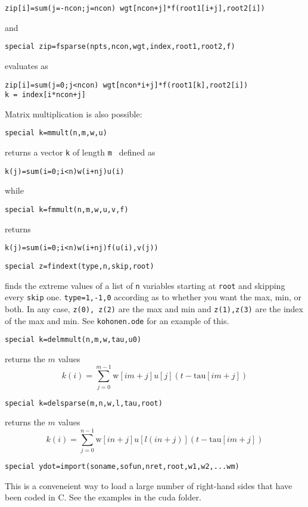 \begin{verbatim}
zip[i]=sum(j=-ncon;j=ncon) wgt[ncon+j]*f(root1[i+j],root2[i])
\end{verbatim}
and 
\begin{verbatim}
special zip=fsparse(npts,ncon,wgt,index,root1,root2,f)
\end{verbatim}
evaluates as 
\begin{verbatim}
zip[i]=sum(j=0;j<ncon) wgt[ncon*i+j]*f(root1[k],root2[i])
k = index[i*ncon+j] 
\end{verbatim}
Matrix multiplication is also possible:
\begin{verbatim}
special k=mmult(n,m,w,u)
\end{verbatim}
returns a vector {\tt k}  of length {\tt m } defined as
\begin{verbatim}
k(j)=sum(i=0;i<n)w(i+nj)u(i)
\end{verbatim}
while
 \begin{verbatim}
special k=fmmult(n,m,w,u,v,f)
\end{verbatim} 
returns
\begin{verbatim}
k(j)=sum(i=0;i<n)w(i+nj)f(u(i),v(j))
\end{verbatim}

\begin{verbatim}
special z=findext(type,n,skip,root)
\end{verbatim}
finds the extreme values of a list of {\tt n} variables starting at {\tt root} and skipping every {\tt skip} one.  {\tt type=1,-1,0} according as to whether you want the max, min, or both. In any case, {\tt z(0), z(2)} are the max and min and {\tt z(1),z(3)} are the index of the max and min.  See {\tt kohonen.ode} for an example of this.  

\begin{verbatim}
special k=delmmult(n,m,w,tau,u0)
\end{verbatim}
returns the $m$ values
\[
k(i)=\sum_{j=0}^{m-1} \mbox{w}[i m + j] u[j](t-\mbox{tau}[i m + j])
\]


\begin{verbatim}
special k=delsparse(m,n,w,l,tau,root)
\end{verbatim}
returns the $m$ values
\[
k(i)=\sum_{j=0}^{n-1} \mbox{w}[i n  + j] u[l(i n +j)](t-\mbox{tau}[i m + j])
\]

\begin{verbatim}
special ydot=import(soname,sofun,nret,root,w1,w2,...wm)
\end{verbatim}

This is a conveneient way to load a large number of right-hand sides that have been coded in C.  See the examples in the cuda folder.


